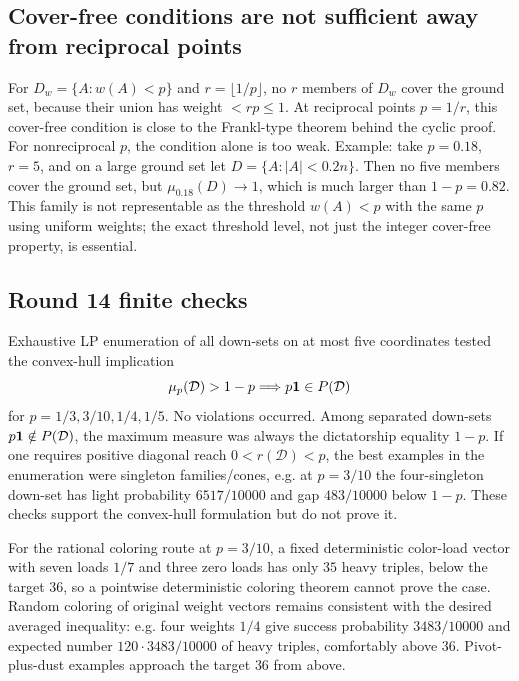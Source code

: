 \documentclass[12pt]{article}
\begin{document}
\subsection*{Cover-free conditions are not sufficient away from reciprocal points}

For \(D_w=\{A:w(A)<p\}\) and \(r=\lfloor1/p\rfloor\), no \(r\) members of
\(D_w\) cover the ground set, because their union has weight \(<rp\le1\).
At reciprocal points \(p=1/r\), this cover-free condition is close to the
Frankl-type theorem behind the cyclic proof.  For nonreciprocal \(p\), the
condition alone is too weak.  Example: take \(p=0.18\), \(r=5\), and on a large
ground set let \(D=\{A:|A|<0.2n\}\).  Then no five members cover the ground set,
but \(\mu_{0.18}(D)\to1\), which is much larger than \(1-p=0.82\).  This family
is not representable as the threshold \(w(A)<p\) with the same \(p\) using
uniform weights; the exact threshold level, not just the integer cover-free
property, is essential.

\subsection*{Round 14 finite checks}

Exhaustive LP enumeration of all down-sets on at most five coordinates tested
the convex-hull implication
\[
  \mu_p(\mathcal D)>1-p\Longrightarrow p{\bf1}\in P(\mathcal D)
\]
for \(p=1/3,3/10,1/4,1/5\).  No violations occurred.  Among separated
down-sets \(p{\bf1}\notin P(\mathcal D)\), the maximum measure was always the
dictatorship equality \(1-p\).  If one requires positive diagonal reach
\(0<r(\mathcal D)<p\), the best examples in the enumeration were singleton
families/cones, e.g. at \(p=3/10\) the four-singleton down-set has light
probability \(6517/10000\) and gap \(483/10000\) below \(1-p\).  These checks
support the convex-hull formulation but do not prove it.

For the rational coloring route at \(p=3/10\), a fixed deterministic color-load
vector with seven loads \(1/7\) and three zero loads has only \(35\) heavy
triples, below the target \(36\), so a pointwise deterministic coloring theorem
cannot prove the case.  Random coloring of original weight vectors remains
consistent with the desired averaged inequality: e.g. four weights \(1/4\) give
success probability \(3483/10000\) and expected number \(120\cdot3483/10000\)
of heavy triples, comfortably above \(36\).  Pivot-plus-dust examples approach
the target \(36\) from above.
\end{document}
